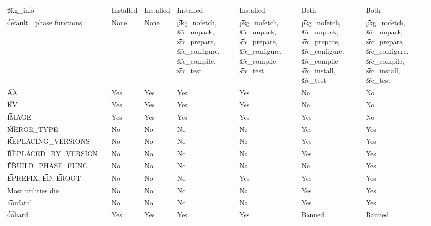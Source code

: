\begin{landscape}
\begin{longtable}{llP{5em}P{5em}P{6em}P{6em}P{6em}P{6em}}
\t{pkg\_info} &  &
    Installed & Installed & Installed & Installed & Both & Both \\

\t{default\_} phase functions &  &
    None & None &
    \t{pkg\_nofetch}, \t{src\_unpack}, \t{src\_prepare}, \t{src\_configure}, \t{src\_compile}, \t{src\_test} &
    \t{pkg\_nofetch}, \t{src\_unpack}, \t{src\_prepare}, \t{src\_configure}, \t{src\_compile}, \t{src\_test} &
    \t{pkg\_nofetch}, \t{src\_unpack}, \t{src\_prepare}, \t{src\_configure},
        \t{src\_compile}, \t{src\_install}, \t{src\_test} &
    \t{pkg\_nofetch}, \t{src\_unpack}, \t{src\_prepare}, \t{src\_configure},
        \t{src\_compile}, \t{src\_install}, \t{src\_test} \\

\t{AA} &  &
    Yes & Yes & Yes & Yes & No & No \\

\t{KV} &  &
    Yes & Yes & Yes & Yes & No & No \\

\t{IMAGE} &  &
    Yes & Yes & Yes & Yes & Yes & No \\

\t{MERGE\_TYPE} &  &
    No & No & No & No & Yes & Yes \\

\t{REPLACING\_VERSIONS} &  &
    No & No & No & No & Yes & Yes \\

\t{REPLACED\_BY\_VERSION} &  &
    No & No & No & No & Yes & Yes \\

\t{EBUILD\_PHASE\_FUNC} &  &
    No & No & No & No & No & Yes \\

\t{EPREFIX}, \t{ED}, \t{EROOT} &  &
    No & No & No & Yes & Yes & Yes \\

Most utilities die &  &
    No & No & No & No & Yes & Yes \\

\t{nonfatal} &  &
    No & No & No & No & Yes & Yes \\

\t{dohard} &  &
    Yes & Yes & Yes & Yes & Banned & Banned \\


\end{longtable}
\end{landscape}
